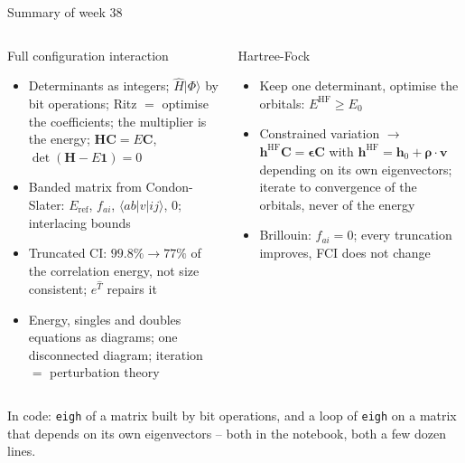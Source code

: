 \documentclass[aspectratio=169,10pt]{beamer}
\newcommand{\ket}[1]{\vert #1\rangle}
\newcommand{\element}[3]{\langle #1\vert #2\vert #3\rangle}
\begin{document}
\begin{frame}{Summary of week 38}
  \small
  \begin{columns}[T]
    \begin{block}{Full configuration interaction}
      \begin{itemize}
        \item Determinants as integers; $\hat{H}\ket{\Phi}$ by bit operations; Ritz $=$ optimise the coefficients; the multiplier is the energy; $\bm{H}\bm{C}=E\bm{C}$, $\det(\bm{H}-E\bm{1})=0$
        \item Banded matrix from Condon-Slater: $E_{\mathrm{ref}}$, $f_{ai}$, $\element{ab}{v}{ij}$, $0$; interlacing bounds
        \item Truncated CI: $99.8\%\to77\%$ of the correlation energy, not size consistent; $e^{\hat{T}}$ repairs it
        \item Energy, singles and doubles equations as diagrams; one disconnected diagram; iteration $=$ perturbation theory
      \end{itemize}
    \end{block}
    \begin{block}{Hartree-Fock}
      \begin{itemize}
        \item Keep one determinant, optimise the orbitals: $E^{\mathrm{HF}}\ge E_0$
        \item Constrained variation $\to$ $\bm{h}^{\mathrm{HF}}\bm{C}=\bm{\epsilon}\bm{C}$ with $\bm{h}^{\mathrm{HF}}=\bm{h}_0+\bm{\rho}\cdot\bm{v}$ depending on its own eigenvectors; iterate to convergence of the orbitals, never of the energy
        \item Brillouin: $f_{ai}=0$; every truncation improves, FCI does not change
      \end{itemize}
    \end{block}
  \end{columns}
  {\footnotesize In code: \texttt{eigh} of a matrix built by bit operations, and a loop of \texttt{eigh} on a matrix that depends on its own eigenvectors -- both in the notebook, both a few dozen lines.}
\end{frame}
\end{document}
